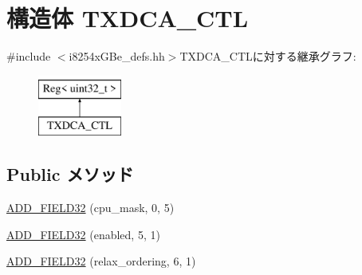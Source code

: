 \hypertarget{structiGbReg_1_1Regs_1_1TXDCA__CTL}{
\section{構造体 TXDCA\_\-CTL}
\label{structiGbReg_1_1Regs_1_1TXDCA__CTL}
}


{\ttfamily \#include $<$i8254xGBe\_\-defs.hh$>$}TXDCA\_\-CTLに対する継承グラフ:\begin{figure}[H]
\begin{center}
\leavevmode
\includegraphics[height=2cm]{structiGbReg_1_1Regs_1_1TXDCA__CTL}
\end{center}
\end{figure}
\subsection*{Public メソッド}
\begin{DoxyCompactItemize}
\item 
\hyperlink{structiGbReg_1_1Regs_1_1TXDCA__CTL_a069ca85e11f7d0b18c82cb943127626f}{ADD\_\-FIELD32} (cpu\_\-mask, 0, 5)
\item 
\hyperlink{structiGbReg_1_1Regs_1_1TXDCA__CTL_a272d87d57b586ec07dfdfbcd872fcd21}{ADD\_\-FIELD32} (enabled, 5, 1)
\item 
\hyperlink{structiGbReg_1_1Regs_1_1TXDCA__CTL_ac738ba64621a4d1b1c15b49be7fb2751}{ADD\_\-FIELD32} (relax\_\-ordering, 6, 1)
\end{DoxyCompactItemize}


